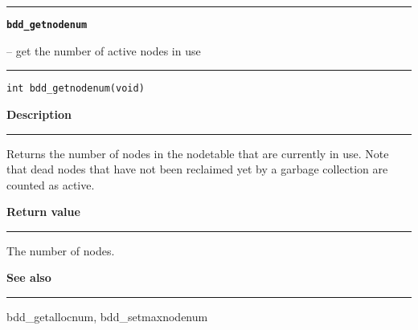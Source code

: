 \begin{minipage}{\textwidth}

\noindent\begin{minipage}{\textwidth}
\rule{\textwidth}{0.5mm}
{\tt\bf bdd\_getnodenum }
\--- get the number of active nodes in use  \hspace{\fill}
\\\rule[1.5ex]{\textwidth}{0.5mm}
\end{minipage}

\noindent\begin{verbatim}
int bdd_getnodenum(void) 
\end{verbatim}

\vspace{\parsep}\noindent
{\bf Description}\\\rule[1.5ex]{\textwidth}{0.2mm}\vspace{-1.5ex}\setlength{\parindent}{1em}
Returns the number of nodes in the nodetable that are
           currently in use. Note that dead nodes that have not been
	   reclaimed yet
	   by a garbage collection are counted as active. 

\setlength{\parindent}{0em}\vspace{\parsep}\vspace{\baselineskip}\noindent
{\bf Return value}\\\rule[1.5ex]{\textwidth}{0.2mm}\vspace{-1.5ex}
The number of nodes. 

\vspace{\parsep}\vspace{\baselineskip}\noindent
{\bf See also}\\\rule[1.5ex]{\textwidth}{0.2mm}\vspace{-1.5ex}
bdd\_getallocnum, bdd\_setmaxnodenum 
\end{minipage}
\vspace{8ex}
